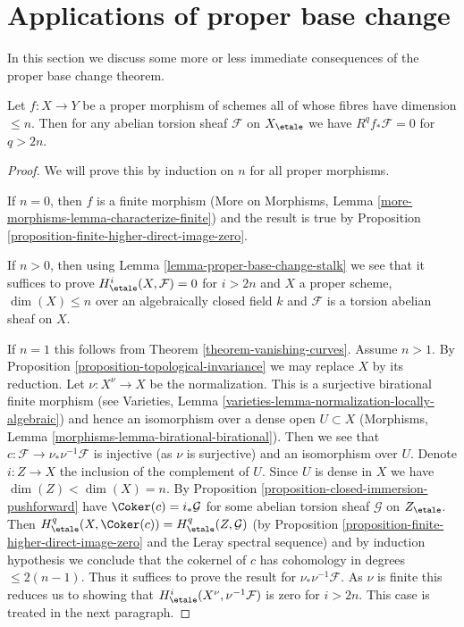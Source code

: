 \section{Applications of proper base change}
\label{section-applications-proper-base-change}

\noindent
In this section we discuss some more or less immediate
consequences of the proper base change theorem.

\begin{lemma}
\label{lemma-cohomological-dimension-proper}
Let $f : X \to Y$ be a proper morphism of schemes
all of whose fibres have dimension $\leq n$.
Then for any abelian torsion sheaf $\mathcal{F}$ on $X_\etale$
we have $R^qf_*\mathcal{F} = 0$ for $q > 2n$.
\end{lemma}

\begin{proof}
We will prove this by induction on $n$ for all proper morphisms.

\medskip\noindent
If $n = 0$, then $f$ is a finite morphism
(More on Morphisms, Lemma \ref{more-morphisms-lemma-characterize-finite})
and the
result is true by Proposition \ref{proposition-finite-higher-direct-image-zero}.

\medskip\noindent
If $n > 0$, then using Lemma \ref{lemma-proper-base-change-stalk}
we see that it suffices to prove $H^i_\etale(X, \mathcal{F}) = 0$
for $i > 2n$ and $X$ a proper scheme, $\dim(X) \leq n$
over an algebraically closed field $k$
and $\mathcal{F}$ is a torsion abelian sheaf on $X$.

\medskip\noindent
If $n = 1$ this follows from Theorem \ref{theorem-vanishing-curves}.
Assume $n > 1$. By Proposition \ref{proposition-topological-invariance}
we may replace $X$ by its reduction.
Let $\nu : X^\nu \to X$ be the normalization.
This is a surjective birational finite morphism
(see Varieties, Lemma \ref{varieties-lemma-normalization-locally-algebraic})
and hence an isomorphism over a dense open $U \subset X$
(Morphisms, Lemma \ref{morphisms-lemma-birational-birational}).
Then we see that
$c : \mathcal{F} \to \nu_*\nu^{-1}\mathcal{F}$ is injective
(as $\nu$ is surjective) and an isomorphism over $U$.
Denote $i : Z \to X$ the inclusion of the complement of $U$.
Since $U$ is dense in $X$ we have $\dim(Z) < \dim(X) = n$.
By Proposition \ref{proposition-closed-immersion-pushforward} have
$\Coker(c) = i_*\mathcal{G}$ for some
abelian torsion sheaf $\mathcal{G}$ on $Z_\etale$.
Then $H^q_\etale(X, \Coker(c)) = H^q_\etale(Z, \mathcal{G})$
(by Proposition \ref{proposition-finite-higher-direct-image-zero}
and the Leray spectral sequence) and by induction hypothesis we conclude that
the cokernel of $c$ has cohomology in degrees $\leq 2(n - 1)$.
Thus it suffices to prove the result for $\nu_*\nu^{-1}\mathcal{F}$.
As $\nu$ is finite this reduces us to showing
that $H^i_\etale(X^\nu, \nu^{-1}\mathcal{F})$ is
zero for $i > 2n$. This case is treated in the next paragraph.


\end{proof}
